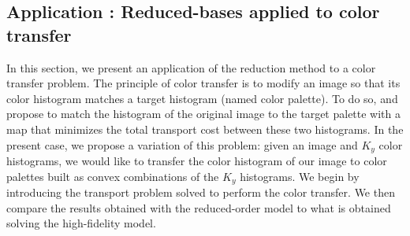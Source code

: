 \documentclass{article}
\begin{document}
\subsection{Application : Reduced-bases applied to color transfer}\label{subsection: color transfer}
In this section, we present an application of the reduction method to a color transfer problem. The principle of color transfer is to modify an image so that its  color histogram matches a target histogram (named color palette). To do so, \cite{pitie2007automated} and \cite{rabin2010regularization} propose to match the histogram of the original image to the target palette with a map that minimizes the total transport cost between these two histograms.
%
In the present case, we propose a variation of this problem: given an image and $K_y$ color histograms, we would like to transfer the color histogram of our image to color palettes built as convex combinations of the $K_y$ histograms. We begin by introducing the transport problem solved to perform the color transfer. We then compare the results obtained with the reduced-order model to what is obtained solving the high-fidelity model.
%
\end{document}
